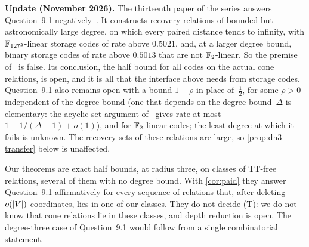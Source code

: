 \textbf{Update (November 2026).} The thirteenth paper of the series answers Question~9.1
negatively~\cite[Theorem~A and Corollary~A$'$]{StorageCodes2026}. It constructs recovery relations of bounded but
astronomically large degree, on which every paired distance tends to infinity, with $\mathbb{F}_{127^2}$-linear storage codes of
rate above $0.5021$, and, at a larger degree bound, binary storage codes of rate above $0.5013$ that are not
$\mathbb{F}_2$-linear. So the premise of~\cite[Proposition~9.2]{DirectedRecovery2026} is false. Its conclusion, the half bound
for all codes on the actual cone relations, is open, and it is all that the interface above needs from storage codes.
Question~9.1 also remains open with a bound $1-\rho$ in place of~$\frac12$, for some $\rho>0$ independent of the degree
bound (one that depends on the degree bound~$\Delta$ is elementary: the acyclic-set argument
of~\cite[Proposition~4.14]{FourthPaper2026} gives rate at most $1-1/(\Delta+1)+o(1)$), and for $\mathbb{F}_2$-linear codes; the
least degree at which it fails is unknown. The recovery sets of these relations
are large, so \cref{prop:dn3-transfer} below is unaffected.

Our theorems are exact half bounds, at radius three, on classes of TT-free relations, several of them with no degree
bound. With \cref{cor:paid} they answer Question~9.1 affirmatively for every sequence of relations that, after deleting
$o(\lvert V \rvert)$ coordinates, lies in one of our classes. They do not decide (T): we do not know that cone relations lie in
these classes, and depth reduction is open. The degree-three case of Question~9.1 would follow from a single
combinatorial statement.

